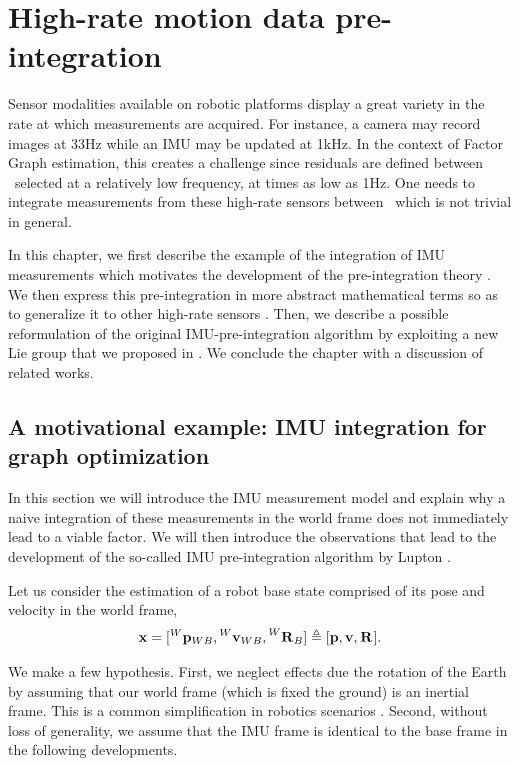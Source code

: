 \chapter{High-rate motion data pre-integration}
\label{chp:pre-integration}
\minitoc
\bigskip


Sensor modalities available on robotic platforms display a great variety in the rate at which measurements are acquired. For instance, 
a camera may record images at 33Hz while an IMU may be updated at 1kHz. In the context of Factor Graph estimation, this creates a challenge since residuals
are defined between \keyframes\ selected at a relatively low frequency, at times as low as 1Hz. One needs to integrate measurements from these high-rate sensors between \keyframes\,
which is not trivial in general.

In this chapter, we first describe the example of the integration of IMU measurements which motivates the development of the pre-integration theory \cite{lupton-09,forster2017-TRO}.
We then express this pre-integration in more abstract mathematical terms so as to generalize it to other high-rate sensors \cite{atchuthan-18-thesis}. 
Then, we describe a possible reformulation of the original IMU-pre-integration algorithm \cite{forster2017-TRO} by exploiting a new Lie group that we 
proposed in \cite{fourmy2019absolute}. We conclude the chapter with a discussion of related works.

  
\section{A motivational example: IMU integration for graph optimization}
\label{sec:imu_preint_motivation}

In this section we will introduce the IMU measurement model and explain why a naive integration of these measurements in the world frame does not immediately
lead to a viable factor. We will then introduce the observations that lead to the development of the so-called IMU pre-integration algorithm by Lupton \cite{lupton-09}.

Let us consider the estimation of a robot base state comprised of its pose and velocity in the world frame,
%
\begin{equation}
    {\bf x} = [\prescript{W}{}{{\bf p}}_{WB}, \prescript{W}{}{{\bf v}}_{WB}, \prescript{W}{}{{\bf R}}_{B}]
    \triangleq 
    [{\bf p}, {\bf v}, \prescript{}{}{{\bf R}}_{}].
\end{equation}

We make a few hypothesis. First, we neglect effects due the rotation of the Earth by assuming 
that our world frame (which is fixed \wrt the ground) is an inertial frame. This is a common simplification in robotics scenarios \cite{forster2017-TRO}. 
Second, without loss of generality, we assume that the IMU frame is identical to the base frame in the following developments.

